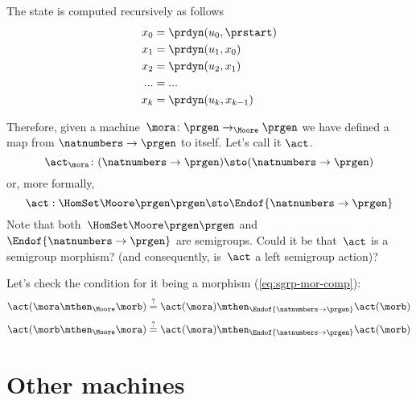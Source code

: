 The state is computed recursively as follows
\begin{equation}\label{eq:actions-on-sequences-x}
  \begin{aligned}
  x_0 &= \prdyn(u_0, \prstart) \\
  x_1 &= \prdyn(u_1, x_0) \\
  x_2 &= \prdyn(u_2, x_1) \\
  ... &= ... \\
  x_{k} &= \prdyn(u_{k}, x_{k-1})
  \end{aligned}
\end{equation}

Therefore, given a machine~$\mora \colon \prgen \to_{\Moore} \prgen$ we have defined a map from $\natnumbers \to \prgen$ to itself. Let's call it $\act$.
%
\begin{equation}\label{eq:actions-on-sequences-1}
\act_{\mora}\colon  (\natnumbers \to \prgen)  \sto  (\natnumbers \to \prgen)
\end{equation}
%
or, more formally,
%
  \begin{equation}\label{eq:actions-on-sequences-2}
    \act: \HomSet\Moore\prgen\prgen \sto \Endof {\natnumbers \to \prgen}
\end{equation}
%
Note that both~$\HomSet\Moore\prgen\prgen$ and $\Endof {\natnumbers \to \prgen}$ are semigroups.
Could it be that~$\act$ is a semigroup morphism? (and consequently, is~$\act$ a left semigroup action)?

Let's check the condition for it being a morphism (\cref{eq:sgrp-mor-comp}):
% 
\begin{equation}\label{eq:actions-on-sequences-left}
  \act ( \mora \mthen_{\Moore} \morb) \stackrel{?}{=}  \act ( \mora) \mthen_{\Endof  {\natnumbers \to \prgen}} \act(\morb)
\end{equation}
% 
\begin{equation}\label{eq:actions-on-sequences-right}
  \act ( \morb \mthen_{\Moore} \mora) \stackrel{?}{=}  \act ( \mora) \mthen_{\Endof  {\natnumbers \to \prgen}} \act(\morb)
\end{equation}


\section{Other machines}


